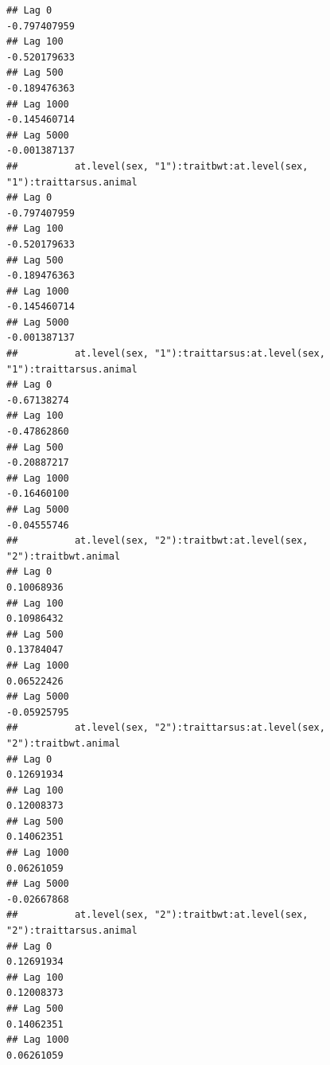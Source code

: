 \documentclass[
  12pt,
]{book}
\begin{document}
\begin{verbatim}
## Lag 0                                                         -0.797407959
## Lag 100                                                       -0.520179633
## Lag 500                                                       -0.189476363
## Lag 1000                                                      -0.145460714
## Lag 5000                                                      -0.001387137
##          at.level(sex, "1"):traitbwt:at.level(sex, "1"):traittarsus.animal
## Lag 0                                                         -0.797407959
## Lag 100                                                       -0.520179633
## Lag 500                                                       -0.189476363
## Lag 1000                                                      -0.145460714
## Lag 5000                                                      -0.001387137
##          at.level(sex, "1"):traittarsus:at.level(sex, "1"):traittarsus.animal
## Lag 0                                                             -0.67138274
## Lag 100                                                           -0.47862860
## Lag 500                                                           -0.20887217
## Lag 1000                                                          -0.16460100
## Lag 5000                                                          -0.04555746
##          at.level(sex, "2"):traitbwt:at.level(sex, "2"):traitbwt.animal
## Lag 0                                                        0.10068936
## Lag 100                                                      0.10986432
## Lag 500                                                      0.13784047
## Lag 1000                                                     0.06522426
## Lag 5000                                                    -0.05925795
##          at.level(sex, "2"):traittarsus:at.level(sex, "2"):traitbwt.animal
## Lag 0                                                           0.12691934
## Lag 100                                                         0.12008373
## Lag 500                                                         0.14062351
## Lag 1000                                                        0.06261059
## Lag 5000                                                       -0.02667868
##          at.level(sex, "2"):traitbwt:at.level(sex, "2"):traittarsus.animal
## Lag 0                                                           0.12691934
## Lag 100                                                         0.12008373
## Lag 500                                                         0.14062351
## Lag 1000                                                        0.06261059

\end{verbatim}
\end{document}
